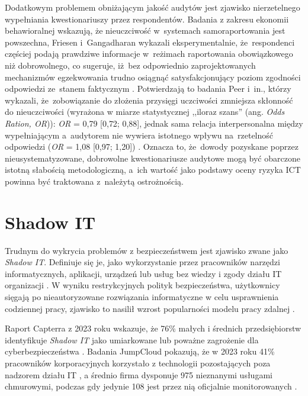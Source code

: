 Dodatkowym problemem obniżającym jakość audytów jest zjawisko nierzetelnego wypełniania kwestionariuszy przez respondentów. Badania z zakresu ekonomii behawioralnej wskazują, że nieuczciwość w~systemach samoraportowania jest powszechna, Friesen i~Gangadharan wykazali eksperymentalnie, że~respondenci częściej podają prawdziwe
informacje w~reżimach raportowania obowiązkowego niż dobrowolnego, co sugeruje, iż~bez odpowiednio zaprojektowanych mechanizmów egzekwowania trudno osiągnąć satysfakcjonujący poziom zgodności
odpowiedzi ze~stanem faktycznym \autocite{friesen2013designing}. Potwierdzają to badania Peer i~in., którzy wykazali, że~zobowiązanie do złożenia przysięgi uczciwości zmniejsza skłonność do nieuczciwości (wyrażona w miarze statystycznej ,,iloraz szans'' (ang.  \textit{Odds Ration, OR})): \textit{OR} = 0{,}79 [0{,}72; 0{,}88], jednak sama relacja interpersonalna między wypełniającym a~audytorem nie wywiera istotnego wpływu na~rzetelność odpowiedzi
(\textit{OR} = 1{,}08 [0{,}97; 1{,}20]) \autocite{peer2023commitment}.
Oznacza to, że~dowody pozyskane poprzez nieusystematyzowane, dobrowolne kwestionariusze audytowe mogą być obarczone istotną słabością metodologiczną, a~ich wartość jako podstawy oceny ryzyka ICT powinna być traktowana z~należytą ostrożnością.

\section{Shadow IT}

Trudnym do wykrycia problemów z bezpieczeństwem jest zjawisko zwane jako \textit{Shadow IT}. 
Definiuje się je, jako wykorzystanie przez pracowników narzędzi informatycznych, 
aplikacji, urządzeń lub usług bez wiedzy i zgody działu IT organizacji  \autocite{ibm_shadowit}. W wyniku restrykcyjnych polityk  bezpieczeństwa, użytkownicy sięgają po nieautoryzowane rozwiązania informatyczne w celu usprawnienia codziennej pracy, zjawisko to nasilił wzrost popularności  modelu pracy zdalnej \autocite{jumpcloud2024}.

Raport Capterra z 2023 roku wskazuje, że 76\% małych i średnich przedsiębiorstw identyfikuje \textit{Shadow IT} jako umiarkowane lub poważne zagrożenie dla cyberbezpieczeństwa \autocite{capterra2023}. Badania JumpCloud pokazują, że 
w 2023 roku 41\% pracowników korporacyjnych korzystało z technologii pozostających 
poza nadzorem działu IT \autocite{jumpcloud2024}, a średnio firma dysponuje 975 
nieznanymi usługami chmurowymi, podczas gdy jedynie 108 jest przez nią oficjalnie 
monitorowanych \autocite{josys2024}.

